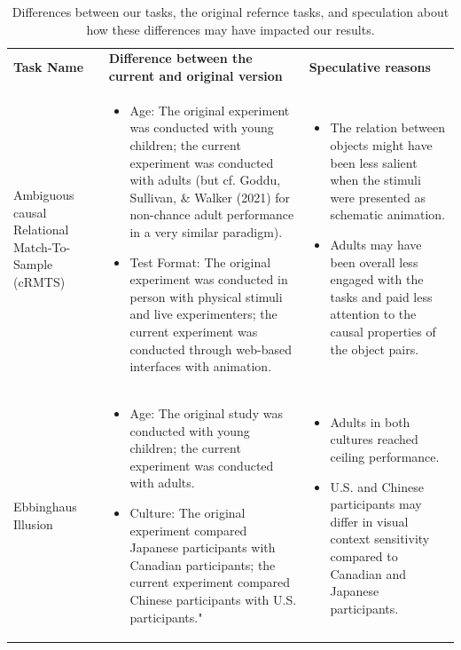 \documentclass[
  man,floatsintext]{apa6}
\begin{document}
\begin{landscape}
    \begin{longtable}{p{3cm}p{10cm}p{8cm}}\\
    \caption{Differences between our tasks, the original refernce tasks, and speculation about how these differences may have impacted our results.}\\
        \hline
        \bf{Task Name} & \bf{Difference between the current and original version} & \bf{Speculative reasons} \\
        \hline
        Ambiguous causal Relational Match-To-Sample (cRMTS) & 
        \begin{itemize}
        \item Age: The original experiment was conducted with young children; the current experiment was conducted with adults (but cf. Goddu, Sullivan, \& Walker (2021) for non-chance adult performance in a very similar paradigm).
        \item Test Format: The original experiment was conducted in person with physical stimuli and live experimenters; the current experiment was conducted through web-based interfaces with animation. 
        \end{itemize}&  
        \begin{itemize}
        \item The relation between objects might have been less salient when the stimuli were presented as schematic animation.
     \item Adults may have been overall less engaged with the tasks and paid less attention to the causal properties of the object pairs.
    \end{itemize}\\

Ebbinghaus Illusion & 
    \begin{itemize}
        \item Age: The original study was conducted with young children; the current experiment was conducted with adults.
        \item Culture: The original experiment compared Japanese participants with Canadian participants; the current experiment compared Chinese participants with U.S. participants."
    \end{itemize} & 
    \begin{itemize}
        \item Adults in both cultures reached ceiling performance. 
        \item U.S. and Chinese participants may differ in visual context sensitivity compared to Canadian and Japanese participants.
    \end{itemize} \\


\end{longtable}
\end{landscape}
\end{document}
